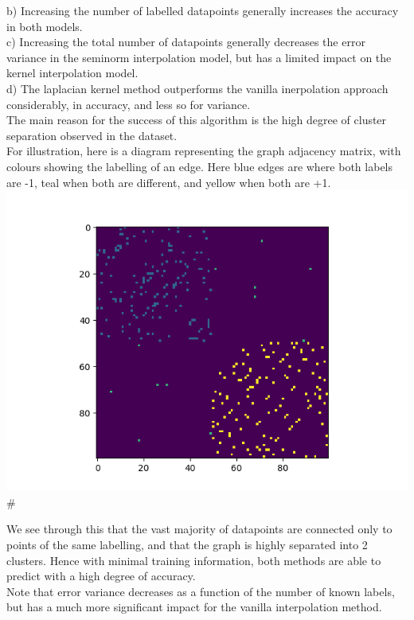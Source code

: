 \documentclass[12pt]{article}
\begin{document}
b) Increasing the number of labelled datapoints generally increases the accuracy in both models.\\

c) Increasing the total number of datapoints generally decreases the error variance in the seminorm interpolation
model, but has a limited impact on the kernel interpolation model. \\

d) The laplacian kernel method outperforms the vanilla inerpolation approach considerably, in accuracy, and less so
for variance. \\


The main reason for the success of this algorithm is the high degree of
 cluster separation observed in the dataset.
\\

For illustration, here is a diagram representing the graph adjacency matrix,
 with colours showing the labelling of an edge. Here blue edges are where both 
labels are -1, teal when both are different, and yellow when both are +1.\\


\includegraphics{outputs/part2/graph_label_diagram.png}#

We see through this that the vast majority of datapoints are connected only to points
of the same labelling, and that the graph is highly separated  into 2 clusters.
Hence with minimal training information, both methods are able to predict with a
 high degree of accuracy.\\

Note that error variance decreases as a function of the number of known labels, but 
has a much more significant impact for the vanilla interpolation method.
\end{document}
